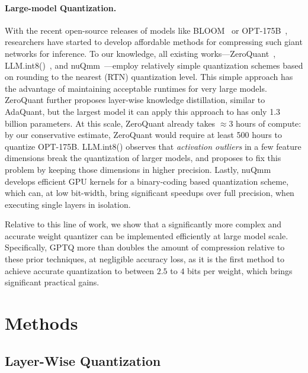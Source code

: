 \paragraph{Large-model Quantization.} With the recent open-source releases of models like BLOOM~\cite{laurencconbigscience} or OPT-175B~\cite{zhang2022opt}, researchers have started to develop affordable methods for compressing such giant networks for inference. 
To our knowledge, all existing works---ZeroQuant~\cite{yao2022zeroquant}, LLM.int8()~\cite{dettmers2022llm}, and nuQmm~\cite{park2022nuqmm}---employ relatively simple quantization schemes based on rounding to the nearest (RTN) quantization level. This simple approach has the advantage of maintaining acceptable runtimes for very large models. 
ZeroQuant further proposes layer-wise knowledge distillation, similar to AdaQuant, but the largest model it can apply this approach to has only 1.3 billion parameters. At this scale, ZeroQuant already takes $\approx 3$ hours of compute: by our conservative estimate, ZeroQuant would require at least 500 hours to quantize OPT-175B. 
LLM.int8() observes that \emph{activation outliers} in a few feature dimensions break the quantization of larger models, and proposes to fix this problem by keeping those dimensions in higher precision. Lastly, nuQmm develops efficient GPU kernels for a binary-coding based quantization scheme, which can, at low bit-width, bring significant speedups over full precision, when executing single layers in isolation. 

Relative to this line of work, we show that a significantly more complex and accurate weight quantizer can be implemented efficiently at large model scale. 
Specifically, GPTQ more than doubles the amount of compression relative to these prior techniques, at negligible accuracy loss, as it is the first method to achieve accurate quantization to between $2.5$ to $4$ bits per weight, which brings significant practical gains.  

\section{Methods}

\subsection{Layer-Wise Quantization}
\label{sec:layerwise-quantization}

